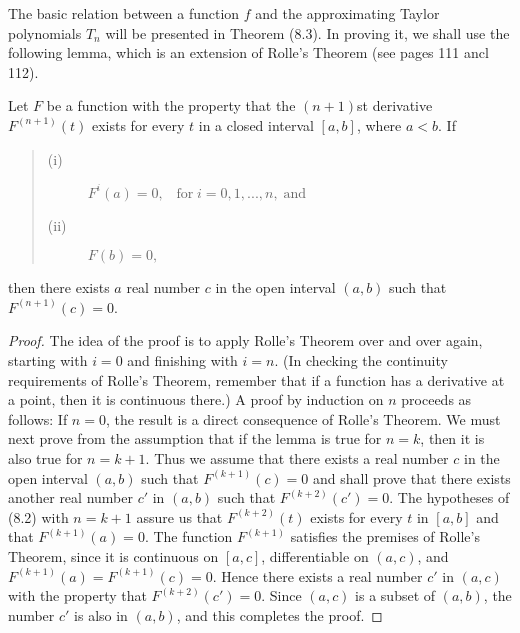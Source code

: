
The basic relation between a function $f$ and the approximating Taylor polynomials $T_n$ will be presented in Theorem (8.3). In proving it, we shall use the following lemma, which is an extension of Rolle's Theorem (see pages 111 ancl 112).

\begin{theorem} Let $F$ be a function with the property that the $(n + 1)$st derivative $F^{(n+1)}(t)$ exists for every $t$ in a closed interval $[a, b]$, where $a < b$. If
 
\begin{quote}
\begin{description}
\item[(i)] $F^{i}(a) = 0, \;\;\;\mathrm{for}\; i = 0, 1, . . ., n, \;\mathrm{and} $
\item[(ii)] $F(b)= 0,$

\end{description}
\end{quote} 
\noindent then there exists $a$ real number $c$ in the open interval $(a, b)$ such that $F^{(n+1)}(c) = 0$.
\end{theorem}

\begin{proof}
The idea of the proof is to apply Rolle's Theorem over and over again, starting with $i = 0$ and finishing with $i = n$. (In checking the continuity requirements of Rolle's Theorem, remember that if a function has a derivative at a point, then it is continuous there.) A proof by
induction on $n$ proceeds as follows: If $n = 0$, the result is a direct consequence of Rolle's Theorem. We must next prove from the assumption that if the lemma is true for $n = k$, then it is also true for $n = k + 1$. Thus we assume that there exists a real number $c$ in the open interval $(a, b)$ such that $F^{(k+1)}(c) = 0$ and shall prove that there exists another real number $c'$ in $(a, b)$ such that $F^{(k+2)}(c') = 0$. The hypotheses of (8.2) with $n = k + 1$ assure us that $F^{(k+2)}(t)$ exists for every $t$ in $[a, b]$ and that $F^{(k+1)}(a) = 0$. The function $F^{(k +1)}$ satisfies the premises of Rolle's Theorem, since it is continuous on $[a, c]$, differentiable on $(a, c)$, and $F^{(k+1)}(a) = F^{(k+1)}(c) = 0$. Hence there exists a real number $c'$ in $(a, c)$ with the property that $F^{(k+2)}(c') = 0$. Since $(a, c)$ is a subset of $(a, b)$, the number $c'$ is also in $(a, b)$, and this completes the proof.
\end{proof}

